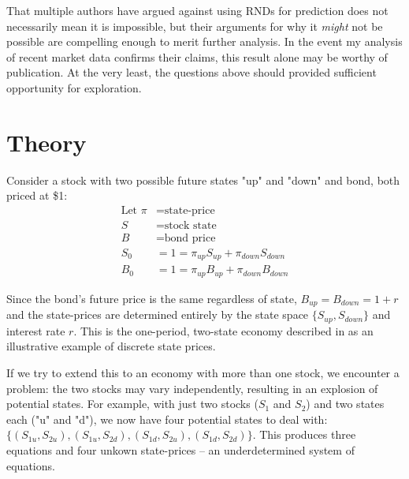 \documentclass[final,3p,times,authoryear]{elsarticle}
\begin{document}
  That multiple authors have argued against using RNDs for prediction does not necessarily mean it is impossible, but their arguments for why it \textit{might} not be possible are compelling enough to merit further analysis. In the event my analysis of recent market data confirms their claims, this result alone may be worthy of publication. At the very least, the questions above should provided sufficient opportunity for exploration.


\section{Theory}
  \label{theory}
  Consider a stock with two possible future states "up" and "down" and bond, both priced at \$1:
  \begin{align}
    \text{Let } \pi &= \text{state-price}\\
    S &= \text{stock state}\\
    B &= \text{bond price}\\
    S_0 &= 1 = \pi_{up} S_{up} + \pi_{down} S_{down}\\
    B_0 &= 1 = \pi_{up} B_{up} + \pi_{down} B_{down}
  \end{align}

  Since the bond's future price is the same regardless of state, $B_{up} = B_{down} = 1 + r$ and the state-prices are determined entirely by the state space $\{S_{up}, S_{down}\}$ and interest rate $r$. This is the one-period, two-state economy described in \citet{jackwerth_option-implied_2004} as an illustrative example of discrete state prices.

  If we try to extend this to an economy with more than one stock, we encounter a problem: the two stocks may vary independently, resulting in an explosion of potential states. For example, with just two stocks ($S_1$ and $S_2$) and two states each ("u" and "d"), we now have four potential states to deal with: $\{(S_{1u}, S_{2u}), (S_{1u}, S_{2d}), (S_{1d}, S_{2u}), (S_{1d}, S_{2d})\}$. This produces three equations and four unkown state-prices -- an underdetermined system of equations. 
\end{document}
